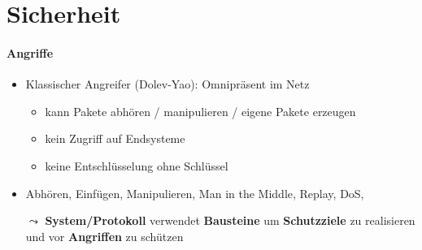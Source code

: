 \section{Sicherheit}

\paragraph{Angriffe}
\begin{itemize}
	\item Klassischer Angreifer (Dolev-Yao): Omnipräsent im Netz
	\begin{itemize}
    \item kann Pakete abhören / manipulieren / eigene Pakete erzeugen
    \item kein Zugriff auf Endsysteme
    \item keine Entschlüsselung ohne Schlüssel
  \end{itemize}
	\item Abhören, Einfügen, Manipulieren, Man in the Middle, Replay, DoS, 
	\item[\( \leadsto \)] \textbf{System/Protokoll} verwendet \textbf{Bausteine} um \textbf{Schutzziele} zu realisieren und vor \textbf{Angriffen} zu schützen
\end{itemize}

